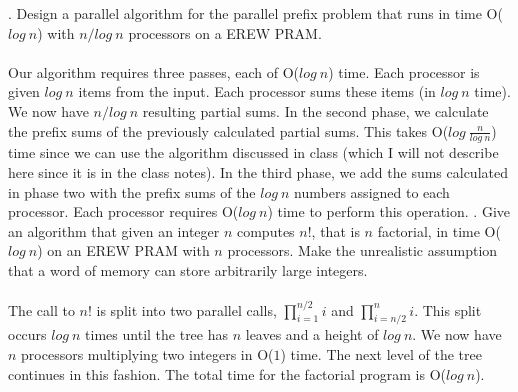 \documentclass[10pt]{article}
\begin{document}
. Design a parallel algorithm for the parallel prefix problem that runs in time O($log~n$) with $n/log~n$
processors on a EREW PRAM.\\
\\
Our algorithm requires three passes, each of O($log~n$) time. Each processor is given $log~n$ items from the
input. Each processor sums these items (in $log~n$ time). We now have $n/log~n$ resulting partial sums. In the
second phase, we calculate the prefix sums of the previously calculated partial sums. This takes O($log~\frac{n}{log~n}$) 
time since we can use the algorithm discussed in class (which I will not describe here since it is in the class notes). 
In the third phase, we add the sums calculated in phase two with the prefix sums of the $log~n$ numbers assigned to 
each processor. Each processor requires O($log~n$) time to perform this operation.
. Give an algorithm that given an integer $n$ computes $n!$, that is $n$ factorial, in time O($log~n$) on an
EREW PRAM with $n$ processors. Make the unrealistic assumption that a word of memory can store
arbitrarily large integers.\\
\\
The call to $n!$ is split into two parallel calls, $\prod_{i=1}^{n/2} i$ and $\prod_{i=n/2}^{n} i$. This
split occurs $log~n$ times until the tree has $n$ leaves and a height of $log~n$. We now have $n$ processors
multiplying two integers in O($1$) time. The next level of the tree continues in this fashion. The total
time for the factorial program is O($log~n$).
\end{document}
